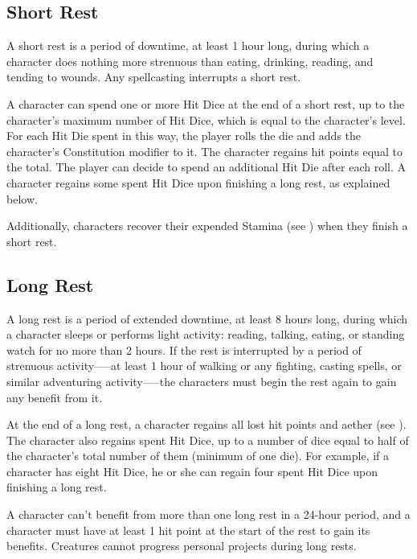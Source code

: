 \subsection{Short Rest}

A short rest is a period of downtime, at least 1 hour long, during which a character does nothing more strenuous than eating, drinking, reading, and tending to wounds. Any spellcasting interrupts a short rest.

A character can spend one or more Hit Dice at the end of a short rest, up to the character's maximum number of Hit Dice, which is equal to the character's level. For each Hit Die spent in this way, the player rolls the die and adds the character's Constitution modifier to it. The character regains hit points equal to the total. The player can decide to spend an additional Hit Die after each roll. A character regains some spent Hit Dice upon finishing a long rest, as explained below.

Additionally, characters recover their expended Stamina (see ) when they finish a short rest.

\subsection{Long Rest}

A long rest is a period of extended downtime, at least 8 hours long, during which a character sleeps or performs light activity: reading, talking, eating, or standing watch for no more than 2 hours. If the rest is interrupted by a period of strenuous activity—--at least 1 hour of walking or any fighting, casting spells, or similar adventuring activity—--the characters must begin the rest again to gain any benefit from it.

At the end of a long rest, a character regains all lost hit points and aether (see ). The character also regains spent Hit Dice, up to a number of dice equal to half of the character's total number of them (minimum of one die). For example, if a character has eight Hit Dice, he or she can regain four spent Hit Dice upon finishing a long rest.

A character can't benefit from more than one long rest in a 24-hour period, and a character must have at least 1 hit point at the start of the rest to gain its benefits. Creatures cannot progress personal projects during long rests.

